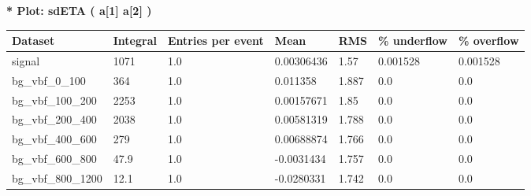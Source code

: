 \documentclass[a4paper, 10pt]{article}
\begin{document}
\textbf{* Plot: sdETA ( a[1] a[2] ) }\\
   \begin{table}[H]
  \begin{center}
    \begin{tabular}{|m{23.0mm}|m{23.0mm}|m{18.0mm}|m{19.0mm}|m{19.0mm}|m{19.0mm}|m{19.0mm}|}
      \hline
      {\cellcolor{yellow}         Dataset}& {\cellcolor{yellow}         Integral}& {\cellcolor{yellow}         Entries per event}& {\cellcolor{yellow}         Mean}& {\cellcolor{yellow}         RMS}& {\cellcolor{yellow}         \% underflow}& {\cellcolor{yellow}         \% overflow}\\
      \hline
      {\cellcolor{white}         signal}& {\cellcolor{white}         1071}& {\cellcolor{white}         1.0}& {\cellcolor{white}         0.00306436}& {\cellcolor{white}         1.57}& {\cellcolor{green}         0.001528}& {\cellcolor{green}         0.001528}\\
      \hline
      {\cellcolor{white}         bg\_vbf\_0\_100}& {\cellcolor{white}         364}& {\cellcolor{white}         1.0}& {\cellcolor{white}         0.011358}& {\cellcolor{white}         1.887}& {\cellcolor{green}         0.0}& {\cellcolor{green}         0.0}\\
      \hline
      {\cellcolor{white}         bg\_vbf\_100\_200}& {\cellcolor{white}         2253}& {\cellcolor{white}         1.0}& {\cellcolor{white}         0.00157671}& {\cellcolor{white}         1.85}& {\cellcolor{green}         0.0}& {\cellcolor{green}         0.0}\\
      \hline
      {\cellcolor{white}         bg\_vbf\_200\_400}& {\cellcolor{white}         2038}& {\cellcolor{white}         1.0}& {\cellcolor{white}         0.00581319}& {\cellcolor{white}         1.788}& {\cellcolor{green}         0.0}& {\cellcolor{green}         0.0}\\
      \hline
      {\cellcolor{white}         bg\_vbf\_400\_600}& {\cellcolor{white}         279}& {\cellcolor{white}         1.0}& {\cellcolor{white}         0.00688874}& {\cellcolor{white}         1.766}& {\cellcolor{green}         0.0}& {\cellcolor{green}         0.0}\\
      \hline
      {\cellcolor{white}         bg\_vbf\_600\_800}& {\cellcolor{white}         47.9}& {\cellcolor{white}         1.0}& {\cellcolor{white}         -0.0031434}& {\cellcolor{white}         1.757}& {\cellcolor{green}         0.0}& {\cellcolor{green}         0.0}\\
      \hline
      {\cellcolor{white}         bg\_vbf\_800\_1200}& {\cellcolor{white}         12.1}& {\cellcolor{white}         1.0}& {\cellcolor{white}         -0.0280331}& {\cellcolor{white}         1.742}& {\cellcolor{green}         0.0}& {\cellcolor{green}         0.0}\\

\end{tabular}
\end{center}
\end{table}
\end{document}
